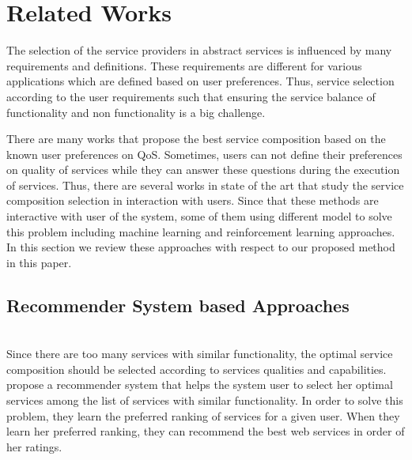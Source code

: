 \documentclass[10pt,journal,compsoc]{IEEEtran}
\begin{document}
\section{Related Works}\label{sec:related-work}

The selection of the service providers in abstract services is influenced by many requirements and definitions. These requirements are different for various applications which are defined based on user preferences. Thus, service selection according to the user requirements such that ensuring the service balance of functionality and non functionality is a big challenge. 


There are many works that propose the best service composition based on the known user preferences on QoS. Sometimes, users can not define their preferences on quality of services while they can answer these questions during the execution of services. Thus, there are several works in state of the art that study the service composition selection in interaction with users. Since that these methods are interactive with user of the system, some of them using different model to solve this problem including machine learning and reinforcement learning approaches. In this section we review these approaches with respect to our proposed method in this paper. 

\subsection{Recommender System based Approaches}
\cite{Manikrao2005}  \\
Since there are too many services with similar functionality, the optimal service composition should be selected according to services qualities and capabilities. \cite{Manikrao2005} propose a recommender system that helps the system user to select her optimal services among the list of services with similar functionality. In order to solve this problem, they learn the preferred ranking of services for a given user. When they learn her preferred ranking, they can recommend the best web services in order of her ratings. 

%
\end{document}
